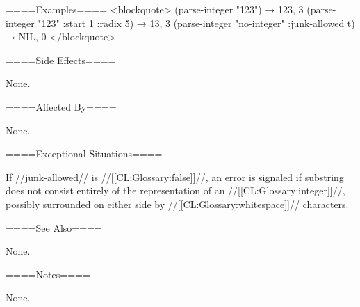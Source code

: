 ====Examples==== <blockquote> (parse-integer "123") → 123, 3 (parse-integer "123" :start 1 :radix 5) → 13, 3 (parse-integer "no-integer" :junk-allowed t) → NIL, 0 </blockquote>

====Side Effects====

None.

====Affected By====

None.

====Exceptional Situations====

If //junk-allowed// is //[[CL:Glossary:false]]//, an error is signaled if substring does not consist entirely of the representation of an //[[CL:Glossary:integer]]//, possibly surrounded on either side by //[[CL:Glossary:whitespace]]// characters.

====See Also====

None.

====Notes====

None.

 
